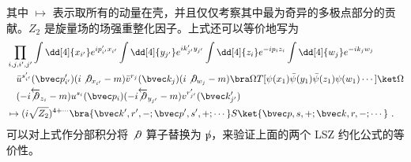 其中 $\mapsto$ 表示取所有的动量在壳，并且仅仅考察其中最为奇异的多极点部分的贡献。$Z_2$ 是旋量场的场强重整化因子。上式还可以等价地写为
\begin{equation}
\begin{aligned}
&
\prod_{i,j,i',j'}
\int \dd[4]{x_{i'}} e^{ip'_{i'}x_{i'}}
\int \dd[4]{y_{j'}} e^{ik'_{j'}y_{j'}}
\int \dd[4]{z_{i}}e^{-ip_{i}z_{i}}
\int \dd[4]{w_{j}}e^{-ik_{j}w_{j}}
\\
&
\quad \bar u^{s'_{i'}}(\bvec p'_{i'})(i\not \partial_{x_{i'}}-m) \bar v^{r_{j}}(\bvec k_{j})(i\not \partial_{w_{j}}-m) 
\bra\Omega T[\psi(x_1)\bar\psi(y_1)\bar\psi(z_1)\psi(w_1)\cdots]\ket \Omega \\
&
\quad (-i\overleftarrow{\not \partial}_{z_i} -m )u^{s_i}(\bvec p_i) (-i\overleftarrow{\not \partial}_{y_{j'}}-m) v^{r'_{j'}}(\bvec k'_{j'})
\\
&
\mapsto 
(i\sqrt{Z_2})^{4+\cdots} \bra{\bvec k',r',-;\bvec p',s',+;\cdots} S \ket{\bvec p,s,+;\bvec k,r,-;\cdots}~.
\end{aligned}
\end{equation}
可以对上式作分部积分将 $\not\partial$ 算子替换为 $\not p$，来验证上面的两个 LSZ 约化公式的等价性。